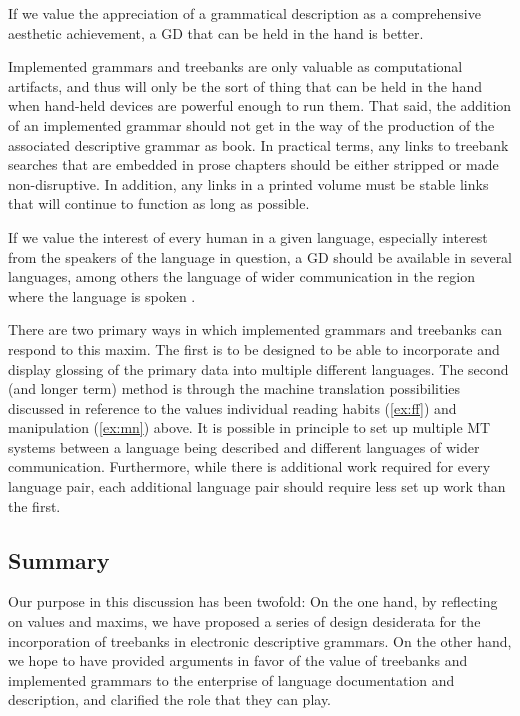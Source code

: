 \begin{exe}
 If we value the appreciation of a grammatical
description as a comprehensive aesthetic achievement, a GD that can 
be held in the hand is better.
\end{exe}

Implemented grammars and treebanks are only valuable as
computational artifacts, and thus will only be the sort of
thing that can be held in the hand when hand-held devices
are powerful enough to run them.  That said, the addition of
an implemented grammar should not get in the way of the production
of the associated descriptive grammar as book.  In practical terms,
any links to treebank searches that are embedded in prose
chapters should be either stripped or made non-disruptive.
In addition, any links in a printed volume must be stable
links that will continue to function as long as possible.

\begin{exe}
 If we value the interest of every human
in a given language, especially interest from the speakers of the language
in question, a GD should be available in several languages, among others
the language of wider communication in the region where the language
is spoken \cite[433]{Weber:06}.
\end{exe}

There are two primary ways in which implemented grammars and treebanks
can respond to this maxim.  The first is to be designed to be able to
incorporate and display glossing of the primary data into multiple
different languages.  The second (and longer term) method is through
the machine translation possibilities discussed in reference to the
values {\sc individual reading habits} (\ref{ex:ff}) and {\sc
  manipulation} (\ref{ex:mn}) above.  It is possible in principle to
set up multiple MT systems between a language being described and
different languages of wider communication.  Furthermore, while there
is additional work required for every language pair, each additional
language pair should require less set up work than the first.

\subsection{Summary}

Our purpose in this discussion has been twofold: On the one hand, by
reflecting on values and maxims, we have proposed a series of design
desiderata for the incorporation of treebanks in electronic
descriptive grammars.  On the other hand, we hope to have provided
arguments in favor of the value of treebanks and implemented grammars
to the enterprise of language documentation and description, and
clarified the role that they can play.

